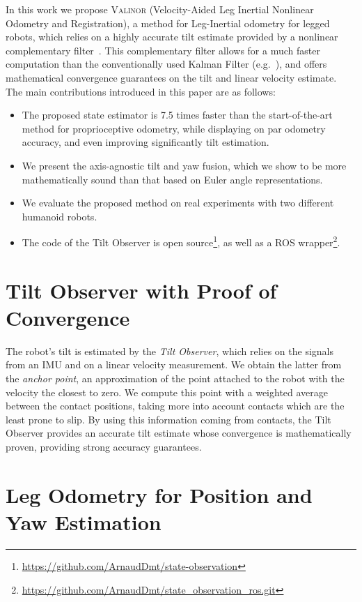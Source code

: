 \documentclass[10pt,twocolumn]{ICCAS}
\begin{document}
In this work we propose {\scshape Valinor} (Velocity-Aided Leg Inertial Nonlinear Odometry and Registration), a method for Leg-Inertial odometry for legged robots, which relies on a highly accurate tilt estimate provided by a nonlinear complementary filter~\cite{benallegue2020LyapunovStableOrientationEstimatorHumanoids}. This complementary filter allows for a much faster computation than the conventionally used Kalman Filter (e.g.~\cite{Hartley2020RIEKF}), and offers mathematical convergence guarantees on the tilt and linear velocity estimate. \\
The main contributions introduced in this paper are as follows:
\begin{itemize}
  \item The proposed state estimator is 7.5 times faster than the start-of-the-art method for proprioceptive odometry, while displaying on par odometry accuracy, and even improving significantly tilt estimation.
  \item We present the axis-agnostic tilt and yaw fusion, which we show to be more mathematically sound than that based on Euler angle representations.
  \item We evaluate the proposed method on real experiments with two different humanoid robots.
  \item The code of the Tilt Observer is open source\footnote{\scriptsize \url{https://github.com/ArnaudDmt/state-observation}}, as well as a ROS wrapper\footnote{\scriptsize \url{https://github.com/ArnaudDmt/state_observation_ros.git}}.
\end{itemize}

\section{Tilt Observer with Proof of Convergence} \label{sec:Tilt}
The robot's tilt is estimated by the \emph{Tilt Observer}, which relies on the signals from an IMU and on a linear velocity measurement. We obtain the latter from the \emph{anchor point}, an approximation of the point attached to the robot with the velocity the closest to zero. We compute this point with a weighted average between the contact positions, taking more into account contacts which are the least prone to slip. By using this information coming from contacts, the Tilt Observer provides an accurate tilt estimate whose convergence is mathematically proven, providing strong accuracy guarantees.

\section{Leg Odometry for Position and Yaw Estimation}\label{sec:Leg_odom}
\end{document}
